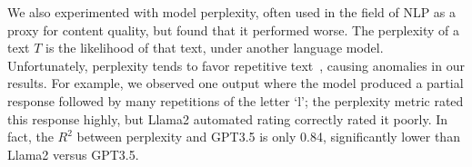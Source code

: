 We also experimented with
model perplexity, often used in the field of NLP
as a proxy for content quality, but found that it performed worse.
%
The perplexity of a text $T$ is the likelihood of that text,
under another language model.
%
%
%
Unfortunately, perplexity tends to favor repetitive text~\citep{holtzman_curious_2020,welleck_neural_2020},
causing anomalies in our results.
%
For example, we observed one output where the model produced a partial response followed by many repetitions of the letter `l'; the perplexity metric rated this response highly, but Llama2 automated rating correctly rated it poorly.
In fact, the $R^2$ between perplexity and GPT3.5 is only 0.84, significantly lower than Llama2 versus GPT3.5. 





